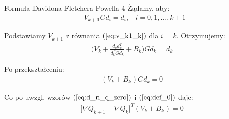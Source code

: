   \begin{frame}{Formuła Davidona-Fletchera-Powella 4}
    Żądamy, aby:
    \begin{equation*}
      \begin{aligned}
        &V_{k + 1} G d_i = d_i, &i = 0, 1, ..., k+1
      \end{aligned}
    \end{equation*}

    Podstawiamy $V_{k + 1}$ z równania $(\ref{eq:v_k1_k})$ dla $i = k$.
    Otrzymujemy:\\
    \begin{equation*}
      \begin{aligned}
        \bigg(V_k + \frac{d_k d_k^T}{d_k^T G d_k} + B_k \bigg) G d_k = d_k
      \end{aligned}
    \end{equation*}

    Po przekształceniu:\\
    \begin{equation*}
      \begin{aligned}
        (V_k + B_k) G d_k = 0
      \end{aligned}
    \end{equation*}

    Co po uwzgl. wzorów $(\ref{eq:d_n_q_zero})$ i $(\ref{eq:def_0})$ daje:\\
    \begin{equation}
      \begin{aligned}
        \big[ \nabla Q_{k + 1} - \nabla Q_k \big]^T (V_k + B_k) = 0
      \end{aligned}
    \end{equation}
  \end{frame}

